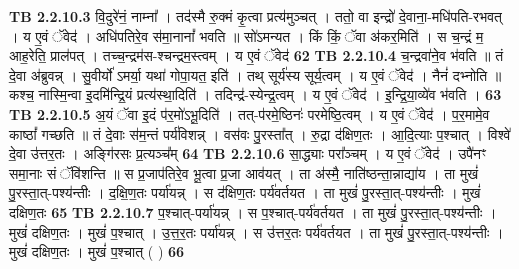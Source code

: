 \documentclass[17pt]{extarticle}
\begin{document}
                  \newline
                                \textbf{ TB 2.2.10.3} \newline
                  वि॒दुरे॑नं॒ नाम्ना᳚ । तद॑स्मै रु॒क्मं कृ॒त्वा प्रत्य॑मुञ्चत् । ततो॒ वा इन्द्रो॑ दे॒वाना॒-मधि॑पति-रभवत् । य ए॒वं ॅवेद॑ । अधि॑पतिरे॒व स॑मा॒नानां᳚ भवति ॥ सो॑ऽमन्यत । किं किं॒ ॅवा अ॑कर॒मिति॑ । स च॒न्द्रं म॒ आह॒रेति॒ प्राल॑पत् । तच्च॒न्द्रम॑स-श्चन्द्रम॒स्त्वम् । य ए॒वं ॅवेद॑ \textbf{ 62} \newline
                  \newline
                                \textbf{ TB 2.2.10.4} \newline
                  च॒न्द्रवा॑ने॒व भ॑वति ॥ तं दे॒वा अ॑ब्रुवन्न् । सु॒वीर्यो॑ ऽमर्या॒ यथा॑ गोपा॒यत॒ इति॑ । तथ् सूर्य॑स्य सूर्य॒त्वम् । य ए॒वं ॅवेद॑ । नैनं॑ दभ्नोति ॥ कश्च॒ नास्मि॒न्वा इ॒दमि॑न्द्रि॒यं प्रत्य॑स्था॒दिति॑ । तदिन्द्र॑-स्येन्द्र॒त्वम् । य ए॒वं ॅवेद॑ । इ॒न्द्रि॒या॒व्ये॑व भ॑वति । \textbf{ 63} \newline
                  \newline
                                \textbf{ TB 2.2.10.5} \newline
                  अ॒यं ॅवा इ॒दं प॑र॒मो॑ऽभू॒दिति॑ । तत्-प॑रमे॒ष्ठिनः॑ परमेष्ठि॒त्वम् । य ए॒वं ॅवेद॑ । प॒र॒मामे॒व काष्ठां᳚ गच्छति ॥ तं दे॒वाः स॑म॒न्तं पर्य॑विशन्न् । वस॑वः पु॒रस्ता᳚त् । रु॒द्रा द॑क्षिण॒तः । आ॒दि॒त्याः प॒श्चात् । विश्वे॑ दे॒वा उ॑त्तर॒तः । अङ्गि॑रसः प्र॒त्यञ्च᳚म् \textbf{ 64} \newline
                  \newline
                                \textbf{ TB 2.2.10.6} \newline
                  सा॒द्ध्याः परा᳚ञ्चम् । य ए॒वं ॅवेद॑ । उपै॑नꣳ समा॒नाः सं ॅवि॑शन्ति ॥ स प्र॒जाप॑तिरे॒व भू॒त्वा प्र॒जा आव॑यत् । ता अ॑स्मै॒ नाति॑ष्ठन्ता॒न्नाद्या॑य । ता मुखं॑ पु॒रस्ता॒त्-पश्य॑न्तीः । द॒क्षि॒ण॒तः पर्या॑यन्न् । स द॑क्षिण॒तः पर्य॑वर्तयत । ता मुखं॑ पु॒रस्ता॒त्-पश्य॑न्तीः । मुखं॑ दक्षिण॒तः \textbf{ 65} \newline
                  \newline
                                \textbf{ TB 2.2.10.7} \newline
                  प॒श्चात्-पर्या॑यन्न् । स प॒श्चात्-पर्य॑वर्तयत । ता मुखं॑ पु॒रस्ता॒त्-पश्य॑न्तीः । मुखं॑ दक्षिण॒तः । मुखं॑ प॒श्चात् । उ॒त्त॒र॒तः पर्या॑यन्न् । स उ॑त्तर॒तः पर्य॑वर्तयत । ता मुखं॑ पु॒रस्ता॒त्-पश्य॑न्तीः । मुखं॑ दक्षिण॒तः । मुखं॑ प॒श्चात् ( ) \textbf{ 66} \newline
                  \newline
\end{document}
